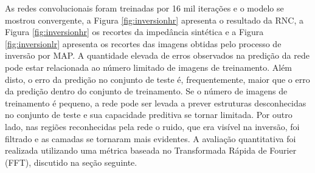 As redes convolucionais foram treinadas por 16 mil iterações e o modelo se mostrou convergente,
a Figura
\ref{fig:inversionhr} apresenta o resultado da RNC, a Figura \ref{fig:inversionhr} os recortes da impedância sintética e a
Figura \ref{fig:inversionlr} apresenta os recortes das imagens obtidas pelo processo de inversão
por MAP. A quantidade elevada de erros observados na predição da rede pode estar relacionada
ao número limitado de imagens de treinamento. Além disto, o erro da predição no conjunto de teste
é, frequentemente, maior que o erro da predição dentro do conjunto de treinamento. Se o número de imagens
de treinamento é pequeno, a rede pode ser levada a prever estruturas desconhecidas no conjunto
de teste e sua capacidade preditiva se tornar limitada. Por outro lado, nas regiões reconhecidas pela rede
o ruido, que era visível na inversão, foi filtrado e as camadas se tornaram mais evidentes.
A avaliação quantitativa foi realizada utilizando uma métrica baseada no Transformada Rápida de Fourier (FFT),
discutido na seção seguinte.
